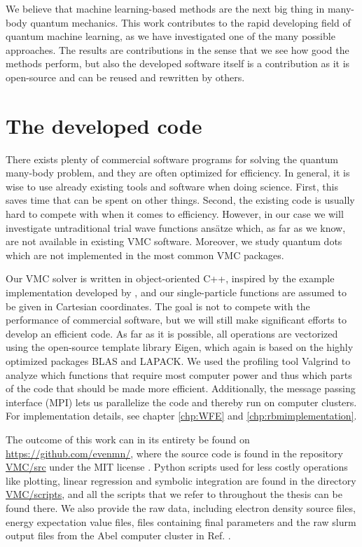 We believe that machine learning-based methods are the next big thing in many-body quantum mechanics. This work contributes to the rapid developing field of quantum machine learning, as we have investigated one of the many possible approaches. The results are contributions in the sense that we see how good the methods perform, but also the developed software itself is a contribution as it is open-source and can be reused and rewritten by others.

\section{The developed code}
There exists plenty of commercial software programs for solving the quantum many-body problem, and they are often optimized for efficiency. In general, it is wise to use already existing tools and software when doing science. First, this saves time that can be spent on other things. Second, the existing code is usually hard to compete with when it comes to efficiency. However, in our case we will investigate untraditional trial wave functions ansätze which, as far as we know, are not available in existing VMC software. Moreover, we study quantum dots which are not implemented in the most common VMC packages. 

Our VMC solver is written in object-oriented C++, inspired by the example implementation developed by \citet{ledum_simple_2016}, and our single-particle functions are assumed to be given in Cartesian coordinates. The goal is not to compete with the performance of commercial software, but we will still make significant efforts to develop an efficient code. As far as it is possible, all operations are vectorized using the open-source template library Eigen, which again is based on the highly optimized packages BLAS and LAPACK. We used the profiling tool Valgrind to analyze which functions that require most computer power and thus which parts of the code that should be made more efficient. Additionally, the message passing interface (MPI) lets us parallelize the code and thereby run on computer clusters. For implementation details, see chapter \ref{chp:WFE} and \ref{chp:rbmimplementation}. 

The outcome of this work can in its entirety be found on \url{https://github.com/evenmn/}, where the source code is found in the repository \href{https://github.com/evenmn/VMC/tree/master/src}{VMC/src} under the MIT license \supercite{noauthor_mit_nodate}. Python scripts used for less costly operations like plotting, linear regression and symbolic integration are found in the directory \href{https://github.com/evenmn/VMC/tree/master/scripts}{VMC/scripts}, and all the scripts that we refer to throughout the thesis can be found there. We also provide the raw data, including electron density source files, energy expectation value files, files containing final parameters and the raw slurm output files from the Abel computer cluster in Ref. \cite{nordhagen_even_marius_2019_3477946}.

